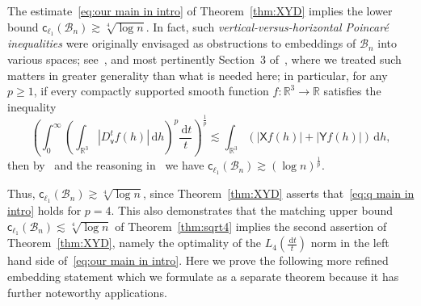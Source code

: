 \documentclass[11pt,reqno]{amsart}
\newcommand{\R}{\mathbb{R}}
\newcommand{\cc}{{\mathsf{c}}}
\newcommand{\vv}{\mathsf{v}}
\newcommand{\XX}{\mathsf{X}}
\newcommand{\YY}{\mathsf{Y}}
\newcommand{\ud}[0]{\,\mathrm{d}}
\newcommand{\0}{\mathbf{0}}
\renewcommand{\1}{\mathbf 1}
\newcommand{\from}{\colon}
\renewcommand{\ge}{\geqslant}
\theoremstyle{remark}
\begin{document}
The estimate~\eqref{eq:our main in intro} of Theorem~\ref{thm:XYD} implies the lower bound $\cc_{\ell_1}(\mathcal{B}_n)\gtrsim \sqrt[4]{\log n}$. In fact, such {\em vertical-versus-horizontal Poincar\'e inequalities }were originally envisaged as obstructions to embeddings of  $\mathcal{B}_n$ into various spaces; see~\cite{AusNaoTes,NN12,LafforgueNaor,NY-STOC}, and most pertinently Section~3 of~\cite{NY18}, where we treated such matters in greater generality than what is needed here; in particular, for any $p\ge 1$,  if every compactly supported smooth function $f\from\R^3\to \R$ satisfies the inequality
\begin{equation}\label{eq:q main in intro}
\left(\int_0^\infty\left(\int_{\R^3} |D_{\vv}^tf(h)|\ud h\right)^p\!\frac{\ud t}{t}\right)^{\frac1{p}}\lesssim \int_{\R^3} \left(|\mathbf{\XX} f(h)|+|\YY f(h)|\right)\ud h,
\end{equation}
then by~\cite[\S~3]{NY18} and the reasoning in~\cite[\S~1.3]{NY18} we have $\cc_{\ell_1}(\mathcal{B}_n)\gtrsim (\log n)^{\frac{1}{p}}$.

Thus, $\cc_{\ell_1}(\mathcal{B}_n)\gtrsim \sqrt[4]{\log n}$, since  Theorem~\ref{thm:XYD}  asserts that~\eqref{eq:q main in intro} holds for $p=4$. This also demonstrates that the matching upper bound $\cc_{\ell_1}(\mathcal{B}_n)\lesssim \sqrt[4]{\log n}$ of Theorem~\ref{thm:sqrt4} implies the second assertion of Theorem~\ref{thm:XYD}, namely the optimality of the $L_4(\frac{\ud t}{t})$ norm in the left hand side of~\eqref{eq:our main in intro}. Here we prove the following more refined embedding statement which we formulate as a separate theorem because it has further noteworthy applications.
\end{document}
